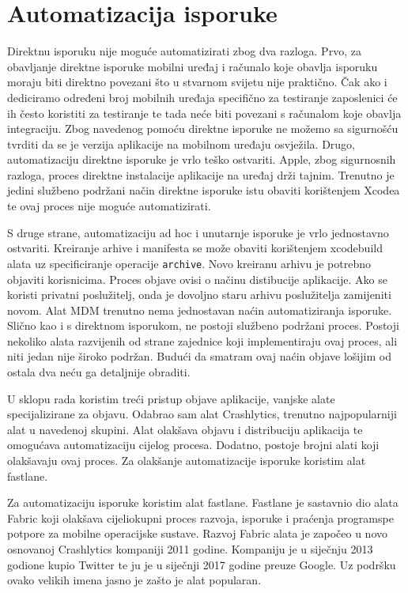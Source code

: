 \documentclass[times, utf8, diplomski, numeric]{fer}
\begin{document}
\section{Automatizacija isporuke}

Direktnu isporuku nije moguće automatizirati zbog dva razloga. Prvo, za obavljanje direktne isporuke mobilni uređaj i računalo koje obavlja isporuku moraju biti direktno povezani što u stvarnom svijetu nije praktično. Čak ako i dediciramo određeni broj mobilnih uređaja specifično za testiranje zaposlenici će ih često koristiti za testiranje te tada neće biti povezani s računalom koje obavlja integraciju. Zbog navedenog pomoću direktne isporuke ne možemo sa sigurnošću tvrditi da se je verzija aplikacije na mobilnom uređaju osvježila. Drugo, automatizaciju direktne isporuke je vrlo teško ostvariti. Apple, zbog sigurnosnih razloga, proces direktne instalacije aplikacije na uređaj drži tajnim. Trenutno je jedini službeno podržani način direktne isporuke istu obaviti korištenjem Xcodea te ovaj proces nije moguće automatizirati.

S druge strane, automatizaciju ad hoc i unutarnje isporuke je vrlo jednostavno ostvariti. Kreiranje arhive i manifesta se može obaviti korištenjem xcodebuild alata uz specificiranje operacije \verb|archive|. Novo kreiranu arhivu je potrebno objaviti korisnicima. Proces objave ovisi o načinu distibucije aplikacije. Ako se koristi privatni poslužitelj, onda je dovoljno staru arhivu poslužitelja zamijeniti novom. Alat MDM trenutno nema jednostavan naćin automatiziranja isporuke. Slično kao i s direktnom isporukom, ne postoji službeno podržani proces. Postoji nekoliko alata razvijenih od strane zajednice koji implementiraju ovaj proces, ali niti jedan nije široko podržan. Budući da smatram ovaj naćin objave lošijim od ostala dva neću ga detaljnije obraditi.

U sklopu rada koristim treći pristup objave aplikacije, vanjske alate specijalizirane za objavu. Odabrao sam alat Crashlytics, trenutno najpopularniji alat u navedenoj skupini. Alat olakšava objavu i distribuciju aplikacija te omogućava automatizaciju cijelog procesa. Dodatno, postoje brojni alati koji olakšavaju ovaj proces. Za olakšanje automatizacije isporuke koristim alat fastlane.

Za automatizaciju isporuke koristim alat fastlane. Fastlane je sastavnio dio alata Fabric koji olakšava cijeliokupni proces razvoja, isporuke i praćenja programspe potpore za mobilne operacijske sustave. Razvoj Fabric alata je započeo u novo osnovanoj Crashlytics kompaniji 2011 godine. Kompaniju je u siječnju 2013 godione kupio Twitter te ju je u siječnji 2017 godine preuze Google. Uz podršku ovako velikih imena jasno je zašto je alat popularan.
\end{document}
